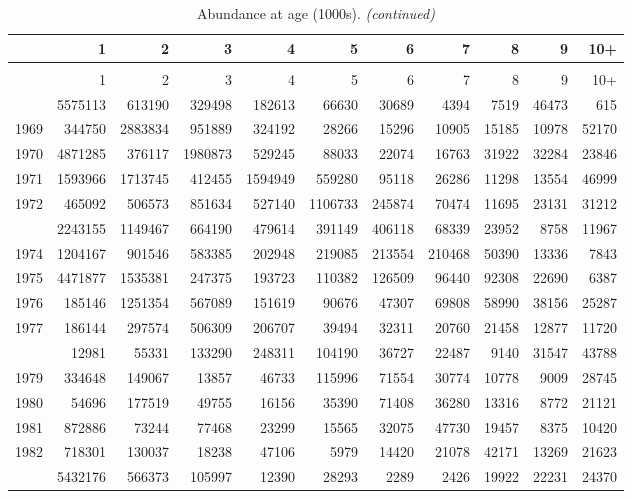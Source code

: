 \documentclass[
]{article}
\begin{document}
\begin{longtable}[t]{lrrrrrrrrrr}
\caption{\label{tab:NAA-table}Abundance at age (1000s).}\\
\toprule
  & 1 & 2 & 3 & 4 & 5 & 6 & 7 & 8 & 9 & 10+\\
\midrule
\endfirsthead
\caption[]{Abundance at age (1000s). \textit{(continued)}}\\
\toprule
  & 1 & 2 & 3 & 4 & 5 & 6 & 7 & 8 & 9 & 10+\\
\midrule
\endhead

\endfoot
\bottomrule
\endlastfoot
1968 & 5575113 & 613190 & 329498 & 182613 & 66630 & 30689 & 4394 & 7519 & 46473 & 615\\
1969 & 344750 & 2883834 & 951889 & 324192 & 28266 & 15296 & 10905 & 15185 & 10978 & 52170\\
1970 & 4871285 & 376117 & 1980873 & 529245 & 88033 & 22074 & 16763 & 31922 & 32284 & 23846\\
1971 & 1593966 & 1713745 & 412455 & 1594949 & 559280 & 95118 & 26286 & 11298 & 13554 & 46999\\
1972 & 465092 & 506573 & 851634 & 527140 & 1106733 & 245874 & 70474 & 11695 & 23131 & 31212\\
\addlinespace
1973 & 2243155 & 1149467 & 664190 & 479614 & 391149 & 406118 & 68339 & 23952 & 8758 & 11967\\
1974 & 1204167 & 901546 & 583385 & 202948 & 219085 & 213554 & 210468 & 50390 & 13336 & 7843\\
1975 & 4471877 & 1535381 & 247375 & 193723 & 110382 & 126509 & 96440 & 92308 & 22690 & 6387\\
1976 & 185146 & 1251354 & 567089 & 151619 & 90676 & 47307 & 69808 & 58990 & 38156 & 25287\\
1977 & 186144 & 297574 & 506309 & 206707 & 39494 & 32311 & 20760 & 21458 & 12877 & 11720\\
\addlinespace
1978 & 12981 & 55331 & 133290 & 248311 & 104190 & 36727 & 22487 & 9140 & 31547 & 43788\\
1979 & 334648 & 149067 & 13857 & 46733 & 115996 & 71554 & 30774 & 10778 & 9009 & 28745\\
1980 & 54696 & 177519 & 49755 & 16156 & 35390 & 71408 & 36280 & 13316 & 8772 & 21121\\
1981 & 872886 & 73244 & 77468 & 23299 & 15565 & 32075 & 47730 & 19457 & 8375 & 10420\\
1982 & 718301 & 130037 & 18238 & 47106 & 5979 & 14420 & 21078 & 42171 & 13269 & 21623\\
\addlinespace
1983 & 5432176 & 566373 & 105997 & 12390 & 28293 & 2289 & 2426 & 19922 & 22231 & 24370\\

\end{longtable}
\end{document}
